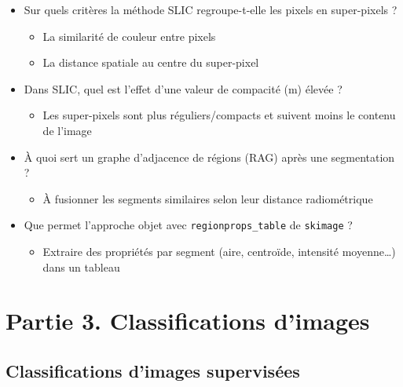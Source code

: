 \documentclass[
  french,
  11pt,
  letterpaper,
  open=any,
  twoside=false,
  french]{scrbook}
\providecommand{\tightlist}{%
  \setlength{\itemsep}{0pt}\setlength{\parskip}{0pt}}
\begin{document}
\begin{itemize}
  \begin{itemize}
  \tightlist
  \item
    préserve les détails de l'image d'origine
  \end{itemize}
\item
  Sur quels critères la méthode SLIC regroupe-t-elle les pixels en
  super-pixels ?

  \begin{itemize}
  \tightlist
  \item
    La similarité de couleur entre pixels
  \item
    La distance spatiale au centre du super-pixel
  \end{itemize}
\item
  Dans SLIC, quel est l'effet d'une valeur de compacité (m) élevée ?

  \begin{itemize}
  \tightlist
  \item
    Les super-pixels sont plus réguliers/compacts et suivent moins le
    contenu de l'image
  \end{itemize}
\item
  À quoi sert un graphe d'adjacence de régions (RAG) après une
  segmentation ?

  \begin{itemize}
  \tightlist
  \item
    À fusionner les segments similaires selon leur distance
    radiométrique
  \end{itemize}
\item
  Que permet l'approche objet avec \texttt{regionprops\_table} de
  \texttt{skimage} ?

  \begin{itemize}
  \tightlist
  \item
    Extraire des propriétés par segment (aire, centroïde, intensité
    moyenne\ldots) dans un tableau
  \end{itemize}
\end{itemize}

\part{Partie 3. Classifications d'images}


\chapter{Classifications d'images supervisées}\label{sec-chap05}
\end{document}

